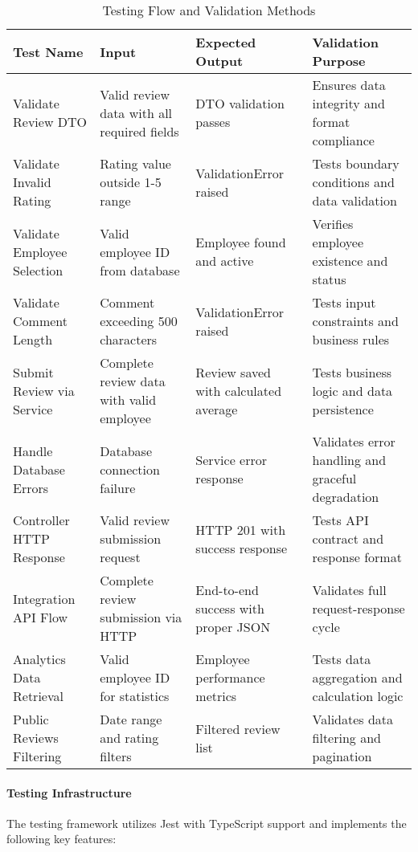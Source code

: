 \begin{table}[h]
\centering
\caption{Testing Flow and Validation Methods}
\label{tab:testing_flow}
\begin{tabular}{|p{3cm}|p{4cm}|p{4cm}|p{4cm}|}
\hline
\textbf{Test Name} & \textbf{Input} & \textbf{Expected Output} & \textbf{Validation Purpose} \\
\hline
Validate Review DTO & Valid review data with all required fields & DTO validation passes & Ensures data integrity and format compliance \\
\hline
Validate Invalid Rating & Rating value outside 1-5 range & ValidationError raised & Tests boundary conditions and data validation \\
\hline
Validate Employee Selection & Valid employee ID from database & Employee found and active & Verifies employee existence and status \\
\hline
Validate Comment Length & Comment exceeding 500 characters & ValidationError raised & Tests input constraints and business rules \\
\hline
Submit Review via Service & Complete review data with valid employee & Review saved with calculated average & Tests business logic and data persistence \\
\hline
Handle Database Errors & Database connection failure & Service error response & Validates error handling and graceful degradation \\
\hline
Controller HTTP Response & Valid review submission request & HTTP 201 with success response & Tests API contract and response format \\
\hline
Integration API Flow & Complete review submission via HTTP & End-to-end success with proper JSON & Validates full request-response cycle \\
\hline
Analytics Data Retrieval & Valid employee ID for statistics & Employee performance metrics & Tests data aggregation and calculation logic \\
\hline
Public Reviews Filtering & Date range and rating filters & Filtered review list & Validates data filtering and pagination \\
\hline
\end{tabular}
\end{table}

\paragraph{Testing Infrastructure}
The testing framework utilizes Jest with TypeScript support and implements the following key features:

